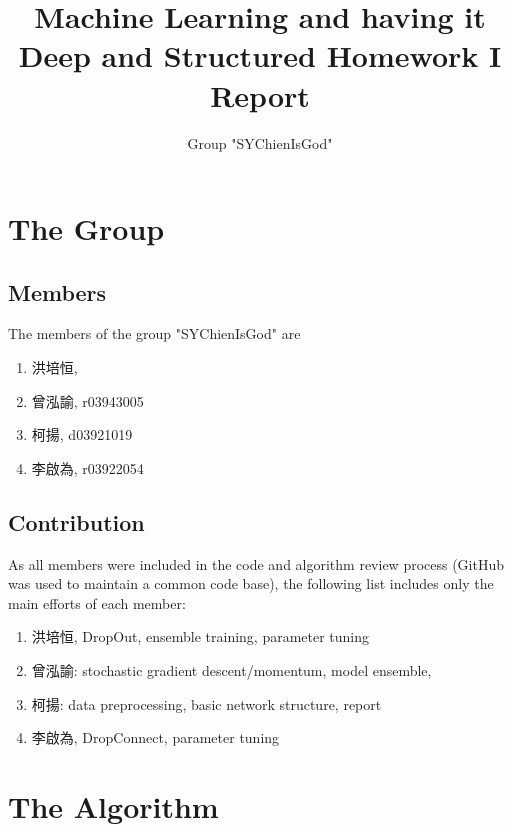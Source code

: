 \documentclass[]{article}
\title{Machine Learning and having it Deep and Structured Homework I Report}
\author{Group "SYChienIsGod"}
\begin{document}
\maketitle


\section{The Group}
\subsection{Members}
The members of the group "SYChienIsGod" are
\begin{CJK}{UTF8}{bsmi}
\begin{enumerate}
	\item 洪培恒, 
	\item 曾泓諭, r03943005
	\item 柯揚, d03921019
	\item 李啟為, r03922054 
\end{enumerate}
\end{CJK}
\subsection{Contribution}
As all members were included in the code and algorithm review process (GitHub was used to maintain a common code base), the following list includes only the main efforts of each member:
\begin{CJK}{UTF8}{bsmi}
	\begin{enumerate}
		\item 洪培恒, DropOut, ensemble training, parameter tuning
		\item 曾泓諭: stochastic gradient descent/momentum, model ensemble, 
		\item 柯揚: data preprocessing, basic network structure, report
		\item 李啟為, DropConnect, parameter tuning
	\end{enumerate}
\end{CJK}
\section{The Algorithm}
\end{document}

